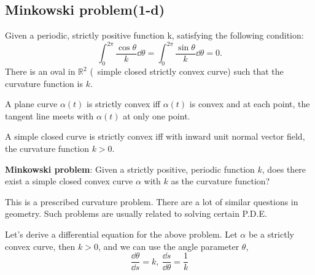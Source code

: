 \subsection{Minkowski problem(1-d)}
\begin{theorem}
    \label{thm: Minkowski problem}
    Given a periodic, strictly positive function k, satisfying the following condition:
    \[\int_0^{2\pi}\frac{\cos \theta}{k}\dd \theta=
    \int_0^{2\pi}\frac{\sin \theta}{k}\dd \theta=0
    .\]
    There is an oval in 
    $\mathbb{R}^2$ (\ie\ simple closed strictly convex curve) such that 
    the curvature function is $k$. 
\end{theorem}
\begin{definition}
    A plane curve $\alpha(t)$ is strictly convex iff $\alpha(t)$ is convex 
    and at each point, the tangent line meets with $\alpha(t)$ at only 
    one point.
\end{definition}
\begin{proposition}
    A simple closed curve is strictly convex iff with inward unit normal 
    vector field, the curvature function $k>0$. 
\end{proposition}
\textbf{Minkowski problem}: Given a strictly positive, periodic function
$k$, does there exist a simple closed convex curve $\alpha$ with $k$
as the curvature function?
\begin{remark}
    This is a prescribed curvature problem. There are a lot of similar 
    questions in geometry. Such problems are usually related to solving
    certain P.D.E.
\end{remark}
Let's derive a differential equation for the above problem. Let $\alpha$ be 
a strictly convex curve, then $k>0$, and we can use the angle parameter $\theta$, \ie\ 
\[\frac{\dd\theta}{\dd s}=k,~\frac{\dd s}{\dd \theta}=\frac{1}{k} \]
\begin{center}
\end{center}
